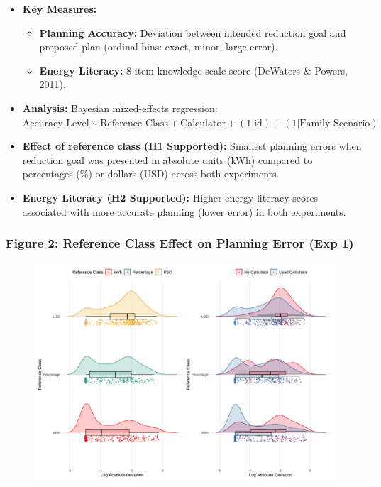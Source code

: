 \documentclass[
  12pt,
]{article}
\providecommand{\tightlist}{%
  \setlength{\itemsep}{0pt}\setlength{\parskip}{0pt}}
\begin{document}
\begin{multicols}{3}
\begin{itemize}
\tightlist
\item
  \textbf{Key Measures:}

  \begin{itemize}
  \tightlist
  \item
    \textbf{Planning Accuracy:} Deviation between intended reduction
    goal and proposed plan (ordinal bins: exact, minor, large error).
  \item
    \textbf{Energy Literacy:} 8-item knowledge scale score (DeWaters \&
    Powers, 2011).
  \end{itemize}
\item
  \textbf{Analysis:} Bayesian mixed-effects regression:
  \(\text{Accuracy Level} \; \text{\textasciitilde} \; \text{Reference Class} + \text{Calculator} + (1|\text{id}) + (1|\text{Family Scenario})\)
\item
  \textbf{Effect of reference class (H1 Supported):} Smallest planning
  errors when reduction goal was presented in absolute units (kWh)
  compared to percentages (\%) or dollars (USD) across both experiments.
\item
  \textbf{Energy Literacy (H2 Supported):} Higher energy literacy scores
  associated with more accurate planning (lower error) in both
  experiments.
\end{itemize}

\subsubsection{Figure 2: Reference Class Effect on Planning Error (Exp
1)}\label{figure-2-reference-class-effect-on-planning-error-exp-1}

\begin{figure}[H]

{\centering \includegraphics[width=0.85\linewidth,height=\textheight,keepaspectratio]{assets/images/fig-s1-log-dist-1.png}

}
\end{figure}
\end{multicols}
\end{document}
